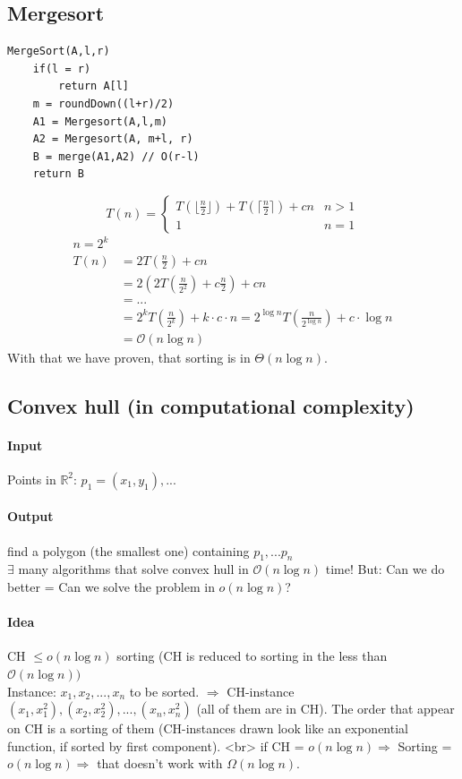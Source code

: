 \subsection{Mergesort}
\begin{verbatim}
MergeSort(A,l,r)
    if(l = r)
        return A[l]
    m = roundDown((l+r)/2)
    A1 = Mergesort(A,l,m)
    A2 = Mergesort(A, m+l, r)
    B = merge(A1,A2) // O(r-l)
    return B
\end{verbatim}

$$T(n) = \begin{cases} T(\lfloor\frac{n}{2}\rfloor) + T\left( \lceil\frac{n}{2} \rceil\right) + cn & n > 1 \\ 1 & n = 1\end{cases}$$ 
\begin{align*}
n = 2^k \\
T(n) &= 2 T(\frac{n}{2}) + cn  \\
&= 2 (2T(\frac{n}{2^2})+ c \frac{n}{2}) + cn \\
&= ... \\
&= 2^kT(\frac{n}{2^k})+k\cdot c \cdot n = 2^{\log n} T(\frac{n}{2^{\log n}})+ c \cdot \log n \\
&= \mathcal{O}(n \log n)
\end{align*}
With that we have proven, that sorting is in $\Theta(n \log n)$.

\subsection{Convex hull (in computational complexity)}
\paragraph{Input} Points in $\mathbb{R}^2$: $p_1 = (x_1,y_1),...$ 
\paragraph{Output} find a polygon (the smallest one) containing $p_1,...p_n$ \\
$\exists$ many algorithms that solve convex hull in $\mathcal{O}(n \log n)$ time! But: Can we do better = Can we solve the problem in $o(n \log n)$? \\
\paragraph{Idea} CH $\leq o(n \log n)$ sorting (CH is reduced to sorting in the less than $\mathcal{O}(n \log n))$ \\
Instance: $x_1,x_2,...,x_n$ to be sorted. $\Rightarrow$ CH-instance $(x_1,x_1^2),(x_2,x_2^2),...,(x_n,x_n^2)$ (all of them are in CH). The order that appear on CH is a sorting of them (CH-instances drawn look like an exponential function, if sorted by first component). <br>
if CH = $o(n \log n) \Rightarrow$   Sorting = $o(n \log n) \Rightarrow$  that doesn't work with $\Omega(n \log n)$.


